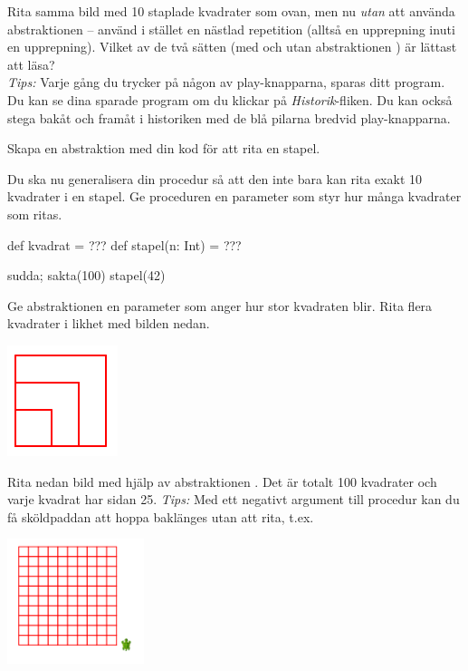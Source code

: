 \Subtask Rita samma bild med 10 staplade kvadrater som ovan, men nu \emph{utan} att använda abstraktionen  -- använd i stället en nästlad repetition (alltså en upprepning inuti en upprepning). Vilket av de två sätten (med och utan abstraktionen ) är lättast att läsa?\\ \emph{Tips:} Varje gång du trycker på någon av play-knapparna, sparas ditt program. Du kan se dina sparade program om du klickar på \emph{Historik}-fliken. Du kan också stega bakåt och framåt i historiken med de blå pilarna bredvid play-knapparna.

\Subtask Skapa en abstraktion  med din kod för att rita en stapel.

\Subtask Du ska nu generalisera din procedur så att den inte bara kan rita exakt 10 kvadrater i en stapel. Ge proceduren  en parameter  som styr hur många kvadrater som ritas.
\begin{Code}
def kvadrat = ???
def stapel(n: Int) = ???

sudda; sakta(100)
stapel(42)
\end{Code}

\Subtask Ge abstraktionen  en parameter  som anger hur stor kvadraten blir. Rita flera kvadrater i likhet med bilden nedan.

\includegraphics{../img/kojo/square-param}

\Subtask Rita nedan bild med hjälp av abstraktionen . Det är totalt 100 kvadrater och varje kvadrat har sidan 25. \emph{Tips:} Med ett negativt argument till procedur  kan du få sköldpaddan att hoppa baklänges utan att rita, t.ex. 

\includegraphics[width=0.3\textwidth]{../img/kojo/square-grid}

